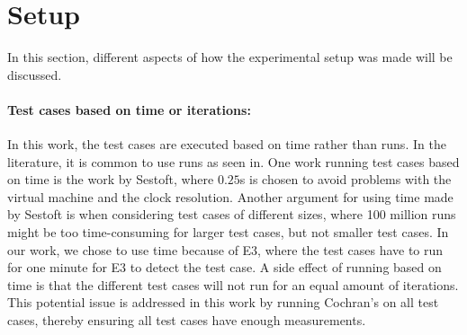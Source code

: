 \section{Setup}

In this section, different aspects of how the experimental setup was made will be discussed.

\paragraph*{Test cases based on time or iterations:} In this work, the test cases are executed based on time rather than runs. In the literature, it is common to use runs as seen in\cite[]{Pereira2017,Koedijk2022diff,Georgiou2020}. One work running test cases based on time is the work by Sestoft\cite[]{sestoft2013microbenchmarks}, where $0.25$s is chosen to avoid problems with the virtual machine and the clock resolution. Another argument for using time made by Sestoft\cite[]{sestoft2013microbenchmarks} is when considering test cases of different sizes, where 100 million runs might be too time-consuming for larger test cases, but not smaller test cases. In our work, we chose to use time because of E3, where the test cases have to run for one minute for E3 to detect the test case. A side effect of running based on time is that the different test cases will not run for an equal amount of iterations. This potential issue is addressed in this work by running Cochran's on all test cases, thereby ensuring all test cases have enough measurements. 



